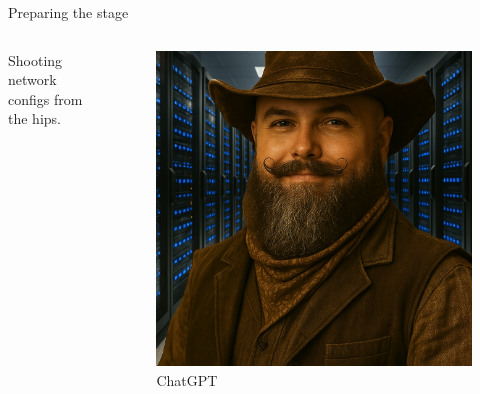 \documentclass[aspectratio=169]{beamer}
\begin{document}
\begin{frame}{Preparing the stage}

  \begin{columns}
    \begin{column}{0.4\textwidth}
      Shooting network configs from the hips.
    \end{column}
    \begin{column}{0.4\textwidth}
      \begin{figure}
        \includegraphics[height = 0.7\textheight]{images/urs_cli_cowboy.png}
        \caption{\footnotesize ChatGPT}
      \end{figure}
    \end{column}
  \end{columns}

\end{frame}
\end{document}
